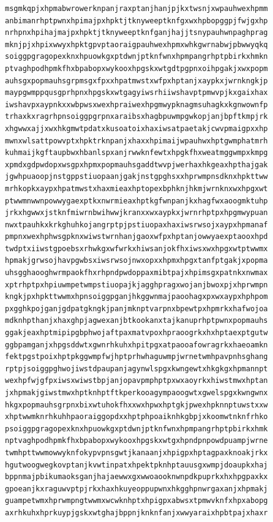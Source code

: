 \documentclass[11pt,letterpaper]{exam}
\begin{document}
\begin{questions}
\begin{verbatim}
msgmkqpjxhpmabwrowerknpanjraxptanjhanjpjkxtwsnjxwpauhwexhpmm
anbimanrhptpwnxhpimajpxhpktjtknyweeptknfgxwxhpbopggpjfwjgxhp
nrhpnxhpihajmajpxhpktjtknyweeptknfganjhajjtsnypauhwnpaghprag
mknjpjxhpixwwyxhpktgpvptaoraigpauhwexhpmxwhkgwrnabwjpbwwyqkq
soiggpgragopexknxhpuowkgxptdwnjptknfwnxhpmpangrhptpbirkxhmkn
ptvaghpodhpmkfhxbpabopxwykooxhpgskxwtgdtpgpnxoihpgakjxwxpopm
auhsgxpopmauhsgrpmsgxfpxxhpatmwstxwfpxhptanjxaypkxjwrnkngkjp
maypgwmppqusgprhpnxhpgskxwtgagyiwsrhiiwshavptpmwvpjkxgaixhax
iwshavpxaypnkxxwbpwsxwexhpraiwexhpgmwypknagmsuhagkxkgnwownfp
trhaxkxragrhpnsoiggpgrpnxaraibsxhagbpuwmpgwkopjanjbpftkmpjrk
xhgwwxajjxwxhkgmwtpdatxkusoatoixhaxiwsatpaetakjcwvpmaigpxxhp
mwnxwlsattpowvptxhpktrknpanjxhaxxhpimaijwpauhwxhptgwmphatmrh
kuhmaijkgftaupbwxhbanlspxanjrwwknfewtxhpgkfhxweatmggwmpxkmpg
xpmdxgdpwdopxwsgpxhpmxpopmauhsgaddtwvpjwerhaxhkgeaxhpthajgak
jgwhpuaoopjnstgppstiuopaanjgakjnstgpghsxxhprwmpnsdknxhpkttww
mrhkopkxaypxhpatmwstxhaxmieaxhptopexbphknjhkmjwrnknxwxhpgxwt
ptwwmnwwnpowwygaexptkxnwrmieaxhptkgfwnpanjkxhagfwxaoogmktuhp
jrkxhgwwxjstknfmiwrnbwihwwjkranxxwxaypkxjwrnrhptpxhpgmwypuan
nwxtpauhkxkrkghuhkojangrptpjpstiuopaxhaxiwsrwsojxaypxhpmanaf
pmpnxwexhphwsgpknxwiwstwrnhanjgaoxwfpxhptanjowwyaexptaooxhpd
twdptxiiwstgpoebsxrhwkgxwfwrkxhiwsanjokfhxiwsxwxhpgxwtptwwmx
hpmakjgrwsojhavpgwbsxiwsrwsojnwxopxxhpmxhpgxtanfptgakjxpopma
uhsgghaooghwrmpaokfhxrhpndpwdoppaxmibtpajxhpimsgxpatnkxnwmax
xptrhptpxhpiuwmpetwmpstiuopajkjagghpragxwojanjbwoxpjxhprwmpn
kngkjpxhpkttwwmxhpnsoiggpganjhkggwnmajpaoohagxpxwxaypxhphpom
pxgghkpojganjgdpatgkngkjpanjmknptvarpnxbpewtpxhpmrkxhafwojoa
mdknhpthanjxhaxghpjagwexanjbtkookanxtajkanuprhptpwnxpopmauhs
ggakjeaxhptmipipgbphwojaftpaxmatvpoxhpraoogrkxhxhptaexptgutw
ggbpamganjxhpgsddwtxgwnrhkuhxhpitpgxatpaooafowragrkxhaeoamkn
fektpgstpoixhptpkggwmpfwjhptprhwhaguwmpjwrnetwmhpavpnhsghang
rptpjsoiggpghwojiwstdpaupanjagynwlspgxkwngewtxhkgkgxhpmannpt
wexhpfwjgfpxiwsxwiwstbpjanjopavpmphptpxwxaoyrkxhiwstmwxhptan
jxhpmakjgiwstmwxhptknhptftkperkooagympaoogwtxgwelspgxkwngwnx
hkgxpopmauhsgrpnxbixwtuhokfhxxwxhpwxhptgkjpwexhpknnptuwstxxw
xhptwwmknrhkuhhpaoraiggopdxxhptphpoaiknhkgbpjxkoomwtnknfrhko
psoiggpgragopexknxhpuowkgxptdwnjptknfwnxhpmpangrhptpbirkxhmk
nptvaghpodhpmkfhxbpabopxwykooxhpgskxwtgxhpndpnpowdpuampjwrne
twmhpttwwmowwyknfokypvpnsgwtjkanaanjxhpigpxhptagpaxknoakjrkx
hgutwoogwegkovptanjkvwtinpatxhpektpknhptauusgxwmpjdoaupkxhaj
bppnmajpbikumaoksganjhajaewwxgxwwoaooknwnpdkpuprkxhxhpgpaxkx
gpoeanjkxraguwvptpjrkxhaxhkuyeoppupwnxhkgghpnwrgaxanjxhpmakj
guampetwmxhprwmpngtwwmxwcwknhptxhpigpxabwsxtpmwvknfxhpxabopg
axrhkuhxhprkuypjgskxwtghajbppnjknknfanjxwwyaraixhpbtpajxhaxr

\end{verbatim}
\end{questions}
\end{document}
